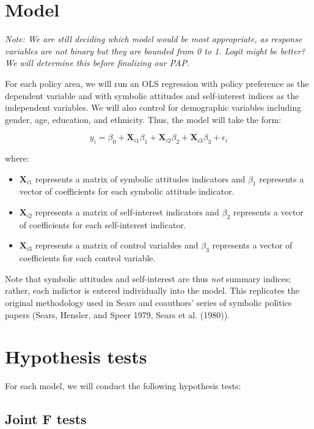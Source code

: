 \documentclass[]{article}
\begin{document}
\section{Model}\label{model}

\textit{Note: We are still deciding which model would be most appropriate, as response variables are not binary but they are bounded from 0 to 1. Logit might be better? We will determine this before finalizing our PAP.}

For each policy area, we will run an OLS regression with policy
preference as the dependent variable and with symbolic attitudes and
self-interest indices as the independent variables. We will also control
for demographic variables including gender, age, education, and
ethnicity. Thus, the model will take the form:

\begin{equation}
y_i = \beta_0 + \textbf{X}_{i1}\beta_1 + \textbf{X}_{i2}\beta_2 +  \textbf{X}_{i3}\beta_3 + \epsilon_i 
\end{equation}

where:

\begin{itemize}
  \item $\textbf{X}_{i1}$ represents a matrix of symbolic attitudes indicators and $\beta_1$ represents a vector of coefficients for each symbolic attitude indicator.
  \item $\textbf{X}_{i2}$ represents a matrix of self-interest indicators and $\beta_2$ represents a vector of coefficients for each self-interest indicator.
  \item $\textbf{X}_{i3}$ represents a matrix of control variables and $\beta_3$ represents a vector of coefficients for each control variable.
\end{itemize}

Note that symbolic attitudes and self-interest are thus \emph{not}
summary indices; rather, each indictor is entered individually into the
model. This replicates the original methodology used in Sears and
coauthors' series of symbolic politics papers (Sears, Hensler, and Speer
1979, Sears et al. (1980)).

\section{Hypothesis tests}\label{hypothesis-tests}

For each model, we will conduct the following hypothesis tests:

\subsection{Joint F tests}\label{joint-f-tests}
\end{document}
